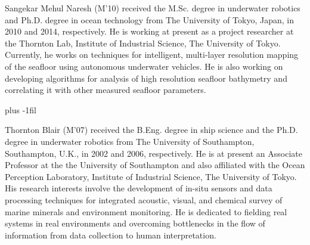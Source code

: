 \begin{IEEEbiography}{Sangekar Mehul Naresh}
(M’10) received the M.Sc. degree in underwater robotics and Ph.D. degree in ocean technology from The University of Tokyo, Japan, in 2010 and 2014, respectively. He is  working at present as a project researcher at the Thornton Lab, Institute of Industrial Science, The University of Tokyo. Currently, he works on techniques for intelligent, multi-layer resolution mapping of the seafloor using autonomous underwater vehicles. He is also working on developing algorithms for analysis of high resolution seafloor bathymetry and correlating it with other measured seafloor parameters.  
\end{IEEEbiography}

\vskip 0pt plus -1fil

\begin{IEEEbiography}{Thornton Blair}
(M’07) received the B.Eng. degree in ship science and the Ph.D. degree in underwater robotics from The University of Southampton, Southampton, U.K., in 2002 and 2006, respectively. He is at present an Associate Professor at the the University of Southampton and also affiliated with the  Ocean Perception Laboratory, Institute of Industrial Science, The University of Tokyo. His research interests involve the development of in-situ sensors and data processing techniques for integrated acoustic, visual, and chemical survey of marine minerals and environment monitoring. He is dedicated to fielding real systems in real environments and overcoming bottlenecks in the flow of information from data collection to human interpretation.
\end{IEEEbiography}

